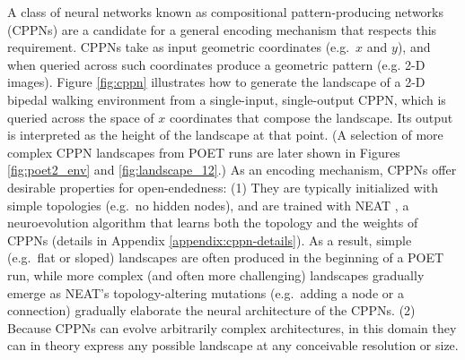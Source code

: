 \documentclass{article}
\newcommand{\ks}[1]{\comments{\textcolor{purple}{[Ken: #1]}}}
\newcommand{\removed}[1]{\comments{\textcolor{gray}{\sout{#1}}}}
\newcommand{\comments}[1]{#1} %
\begin{document}
A class of neural networks known as compositional pattern-producing networks (CPPNs) \cite{stanley2007compositional} are a candidate for a general encoding mechanism that respects this requirement. 
CPPNs take as input geometric coordinates (e.g.\ $x$ and $y$), and when queried across such coordinates produce a geometric pattern (e.g. 2-D images). 
Figure \ref{fig:cppn} illustrates how to generate the landscape of a 2-D bipedal walking environment from a single-input, single-output CPPN, which is queried across the space of $x$ coordinates that compose the landscape. Its output is interpreted as the height of the landscape at that point. (A selection of more complex CPPN landscapes from POET runs are later shown in Figures \ref{fig:poet2_env} and \ref{fig:landscape_12}.) As an encoding mechanism, CPPNs offer desirable properties for open-endedness: (1) They are typically initialized with simple topologies (e.g.\ no hidden nodes), and are trained with NEAT \cite{stanley:ec02}, a neuroevolution \cite{stanley2019nature} algorithm that learns both the topology and the weights of CPPNs (details in Appendix \ref{appendix:cppn-details}). As a result, simple (e.g.\ flat or sloped) landscapes are often produced in the beginning of a POET run, while more complex (and often more challenging) landscapes gradually emerge as NEAT’s topology-altering mutations (e.g.\ adding a node or a connection) gradually elaborate the neural architecture of the CPPNs. (2) Because CPPNs can evolve arbitrarily complex architectures, in this domain they can in theory express any possible landscape at any conceivable resolution or size.  %
\end{document}
